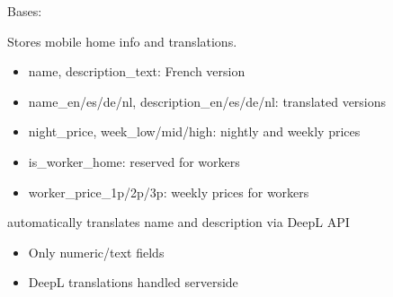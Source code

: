 \documentclass[letterpaper,10pt,english]{sphinxmanual}
\begin{document}
\begin{fulllineitems}
\label{\detokenize{index:bookings.models.MobileHome}}
\pysigstartsignatures
\pysiglinewithargsret
{}
{\sphinxparamcomma {}}
{}
\pysigstopsignatures
\sphinxAtStartPar
Bases: 

\sphinxAtStartPar
Stores mobile home info and translations.
\begin{description}
\begin{itemize}
\item {} 
\sphinxAtStartPar
name, description\_text: French version

\item {} 
\sphinxAtStartPar
name\_en/es/de/nl, description\_en/es/de/nl: translated versions

\item {} 
\sphinxAtStartPar
night\_price, week\_low/mid/high: nightly and weekly prices

\item {} 
\sphinxAtStartPar
is\_worker\_home: reserved for workers

\item {} 
\sphinxAtStartPar
worker\_price\_1p/2p/3p: weekly prices for workers

\end{itemize}

\end{description}


\begin{fulllineitems}

\pysigstartsignatures
\pysigline
{}
\pysigstopsignatures
\sphinxAtStartPar
automatically translates name and description via DeepL API

\end{fulllineitems}

\begin{description}
\begin{itemize}
\item {} 
\sphinxAtStartPar
Only numeric/text fields

\item {} 
\sphinxAtStartPar
DeepL translations handled server\sphinxhyphen{}side


\end{itemize}
\end{description}
\end{fulllineitems}
\end{document}
